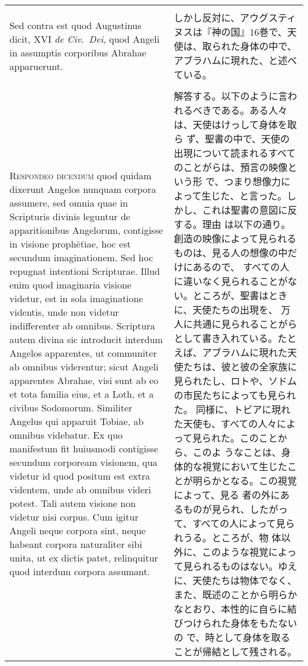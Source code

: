 \documentclass[10pt]{jsarticle} %
\begin{document}
\begin{longtable}{p{21em}p{21em}}
\\\\


Sed contra est quod Augustinus dicit, XVI {\itshape de
Civ.~Dei}, quod Angeli in assumptis corporibus Abrahae apparuerunt.

&

 しかし反対に、アウグスティヌスは『神の国』16巻で、天使は、取られた身体の中で、
 アブラハムに現れた、と述べている。

\\\\


{\scshape Respondeo dicendum} quod quidam dixerunt
Angelos nunquam corpora assumere, sed omnia quae in Scripturis divinis
leguntur de apparitionibus Angelorum, contigisse in visione proph\={e}t\={\i}ae,
hoc est secundum imaginationem. Sed hoc repugnat intentioni
Scripturae. Illud enim quod imaginaria visione videtur, est in sola
imaginatione videntis, unde non videtur indifferenter ab
omnibus. Scriptura autem divina sic introducit interdum Angelos
apparentes, ut communiter ab omnibus viderentur; sicut Angeli apparentes
Abrahae, visi sunt ab eo et tota familia eius, et a Loth, et a civibus
Sodomorum. Similiter Angelus qui apparuit Tobiae, ab omnibus
videbatur. Ex quo manifestum fit huiusmodi contigisse secundum corpoream
visionem, qua videtur id quod positum est extra videntem, unde ab
omnibus videri potest. Tali autem visione non videtur nisi corpus. Cum
igitur Angeli neque corpora sint, neque habeant corpora naturaliter sibi
unita, ut ex dictis patet, relinquitur quod interdum corpora assumant.

&


 解答する。以下のように言われるべきである。ある人々は、天使はけっして身体を取ら
ず、聖書の中で、天使の出現について読まれるすべてのことがらは、預言の映像という形
で、つまり想像力によって生じた、と言った。しかし、これは聖書の意図に反する。理由
は以下の通り。創造の映像によって見られるものは、見る人の想像の中だけにあるので、
すべての人に違いなく見られることがない。ところが、聖書はときに、天使たちの出現を、
万人に共通に見られることがらとして書き入れている。たとえば、アブラハムに現れた天
使たちは、彼と彼の全家族に見られたし、ロトや、ソドムの市民たちによっても見られた。
同様に、トビアに現れた天使も、すべての人々によって見られた。このことから、このよ
うなことは、身体的な視覚において生じたことが明らかとなる。この視覚によって、見る
者の外にあるものが見られ、したがって、すべての人によって見られうる。ところが、物
体以外に、このような視覚によって見られるものはない。ゆえに、天使たちは物体でなく、
また、既述のことから明らかなとおり、本性的に自らに結びつけられた身体をもたないの
で、時として身体を取ることが帰結として残される。


\end{longtable}
\end{document}
